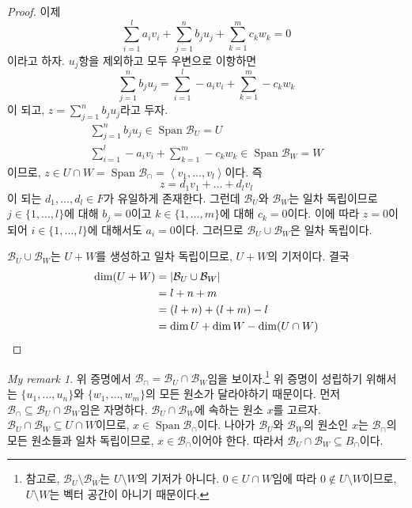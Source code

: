 \documentclass[unfonts,oneside,a4paper]{oblivoir}
\theoremstyle{definition}
\theoremstyle{theorem}
\theoremstyle{remark}
\theoremstyle{remark}
\newtheorem*{myremark}{My remark}
\theoremstyle{remark}
\theoremstyle{remark}
\renewcommand{\vec}[1]{\bm{\mathit{#1}}}
\newcommand{\vecz}{\bm{\mathrm{0}}}
\DeclareMathOperator{\Span}{Span}
\begin{document}
\begin{proof}
    이제
    \begin{equation*}
        \sum_{i = 1}^l a_i \vec v_i + \sum_{j = 1}^n b_j \vec u_j + \sum_{k = 1}^m c_k \vec w_k = \vecz
    \end{equation*}
    이라고 하자.
    $\vec u_j$항을 제외하고 모두 우변으로 이항하면
    \begin{equation*}
        \sum_{j = 1}^n b_j \vec u_j = \sum_{i = 1}^l -a_i \vec v_i + \sum_{k = 1}^m -c_k \vec w_k
    \end{equation*}
    이 되고, $\vec z = \sum_{j = 1}^n b_j \vec u_j$라고 두자.
    \begin{align*}
        \sum_{j = 1}^n b_j \vec u_j \in \Span \mathcal B_U = U\\
        \sum_{i = 1}^l -a_i \vec v_i + \sum_{k = 1}^m -c_k \vec w_k \in \Span \mathcal B_W = W
    \end{align*}
    이므로, $\vec z \in U \cap W = \Span \mathcal B_\cap = \left<\vec v_1, \dots, \vec v_l\right>$이다.
    즉
    \[
        \vec z = d_1 \vec v_1 + \dots + d_l \vec v_l
    \]
    이 되는 $d_1, \dots, \vec d_l \in F$가 유일하게 존재한다.
    그런데 $\mathcal B_U$와 $\mathcal B_W$는 일차 독립이므로 $j \in \{1, \dots, l\}$에 대해 $b_j = 0$이고 $k \in \{1, \dots, m\}$에 대해 $c_k = 0$이다.
    이에 따라 $\vec z = \vecz$이 되어 $i \in \{1, \dots, l\}$에 대해서도 $a_i = 0$이다.
    그러므로 $\mathcal B_U \cup \mathcal B_W$은 일차 독립이다.

    $\mathcal B_U \cup \mathcal B_W$는 $U + W$를 생성하고 일차 독립이므로, $U + W$의 기저이다.
    결국
    \begin{align*}
        \dim (U + W) &= |\mathcal B_U \cup \mathcal B_W|\\
                     &= l + n + m\\
                     &= (l + n) + (l + m) - l\\
                     &= \dim U + \dim W - \dim (U \cap W)\qedhere
    \end{align*}
\end{proof}

\begin{myremark}
    위 증명에서 $\mathcal B_\cap = \mathcal B_U \cap \mathcal B_W$임을 보이자.\footnote{참고로, $\mathcal B_U \setminus \mathcal B_W$는 $U \setminus W$의 기저가 아니다.
    $\vecz \in U \cap W$임에 따라 $\vecz \notin U \setminus W$이므로, $U \setminus W$는 벡터 공간이 아니기 때문이다.}
    위 증명이 성립하기 위해서는 $\{\vec u_1, \dots, \vec u_n\}$와 $\{\vec w_1, \dots, \vec w_m\}$의 모든 원소가 달라야하기 때문이다.
    먼저 $\mathcal B_\cap \subseteq \mathcal B_U \cap \mathcal B_W$임은 자명하다.
    $\mathcal B_U \cap \mathcal B_W$에 속하는 원소 $\vec x$를 고르자.
    $\mathcal B_U \cap \mathcal B_W \subseteq U \cap W$이므로, $\vec x \in \Span \mathcal B_\cap$이다.
    나아가 $\mathcal B_U$와 $\mathcal B_W$의 원소인 $\vec x$는 $\mathcal B_\cap$의 모든 원소들과 일차 독립이므로, $\vec x \in \mathcal B_\cap$이어야 한다.
    따라서 $\mathcal B_U \cap \mathcal B_W \subseteq B_\cap$이다.
\end{myremark}
\end{document}
